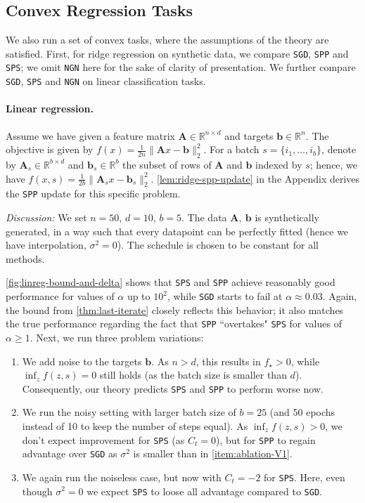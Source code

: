 \documentclass{article}
\newcommand{\R}{\mathbb{R}}
\newcommand{\SGD}{{\texttt{SGD}}}
\newcommand{\SPP}{{\texttt{SPP}}}
\newcommand{\SPS}{{\texttt{SPS}}}
\newcommand{\NGN}{{\texttt{NGN}}}
\theoremstyle{plain}
\theoremstyle{definition}
\theoremstyle{remark}
\begin{document}
%
%
\newcommand{\bA}{\mathbf{A}}
\newcommand{\bb}{\mathbf{b}}

\subsection{Convex Regression Tasks}

We also run a set of convex tasks, where the assumptions of the theory are satisfied.
First, for ridge regression on synthetic data, we compare \SGD{}, \SPP{} and \SPS{}; we omit \NGN{} here for the sake of clarity of presentation.
We further compare \SGD{}, \SPS{} and \NGN{} on linear classification tasks.

\paragraph{Linear regression.}
%
Assume we have given a feature matrix $\bA \in \R^{n \times d}$ and targets $\bb \in \R^n$.
The objective is given by $f(x) = \frac{1}{2n} \|\bA x-\bb\|_2^2$.
For a batch $s=\{i_1,\ldots, i_b\}$, denote by $\bA_s\in \R^{b \times d}$ and $\bb_s \in \R^b$ the subset of rows of $\bA$ and $\bb$ indexed by $s$; hence, we have $f(x,s) = \frac{1}{2b} \|\bA_s x - \bb_s\|_2^2$. \cref{lem:ridge-spp-update} in the Appendix derives the \SPP{} update for this specific problem.



\textit{Discussion:} We set $n=50$, $d=10$, $b=5$. The data $\bA,~\bb$ is synthetically generated, in a way such that every datapoint can be perfectly fitted (hence we have interpolation, $\sigma^2 = 0$). The schedule is chosen to be constant for all methods.

\cref{fig:linreg-bound-and-delta} shows that \SPS{} and \SPP{} achieve reasonably good performance for values of $\alpha$ up to $10^2$, while \SGD{} starts to fail at $\alpha \approx 0.03$. Again, the bound from \cref{thm:last-iterate} closely reflects this behavior; it also matches the true performance regarding the fact that \SPP{} ``overtakes" \SPS{} for values of $\alpha \geq 1$. Next, we run three problem variations:
%
\begin{enumerate}[label=(V\arabic*)]
    \item \label{item:ablation-V1} We add noise to the targets $\bb$. As $n > d$, this results in $f_\star >0$, while $\inf_z f(z,s)=0$ still holds (as the batch size is smaller than $d$). Consequently, our theory predicts \SPS{} and \SPP{} to perform worse now.
    \item \label{item:ablation-V2} We run the noisy setting with larger batch size of $b=25$ (and 50 epochs instead of 10 to keep the number of steps equal). As $\inf_z f(z,s) >0$, we don't expect improvement for \SPS{} (as $C_t=0$), but for \SPP{} to regain advantage over \SGD{} as $\sigma^2$ is smaller than in \ref{item:ablation-V1}.
    \item \label{item:ablation-V3} We again run the noiseless case, but now with $C_t = -2$ for \SPS{}. Here, even though $\sigma^2=0$ we expect \SPS{} to loose all advantage compared to \SGD{}.
\end{enumerate}
\end{document}
